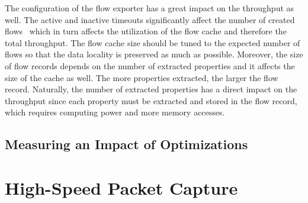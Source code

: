 The configuration of the flow exporter has a great impact on the throughput as well. The active and inactive timeouts significantly affect the number of created flows~\cite{Hofstede-2014-Flow} which in turn affects the utilization of the flow cache and therefore the total throughput. The flow cache size should be tuned to the expected number of flows so that the data locality is preserved as much as possible. Moreover, the size of flow records depends on the number of extracted properties and it affects the size of the cache as well. The more properties extracted, the larger the flow record. Naturally, the number of extracted properties has a direct impact on the throughput since each property must be extracted and stored in the flow record, which requires computing power and more memory accesses.





\subsection{Measuring an Impact of Optimizations}




\section{High-Speed Packet Capture}\label{sec:performance-capture}

